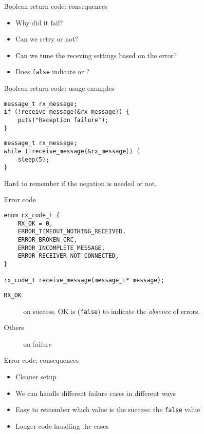 \documentclass[aspectratio=169,14pt]{beamer}
\begin{document}
\begin{frame}[fragile]{Boolean return code: consequences}
    \begin{itemize}
        \item Why did it fail?
        \item Can we retry or not?
        \item Can we tune the receving settings based on the error?
        \item Does \texttt{false} indicate  or ?
    \end{itemize}
\end{frame}


\begin{frame}[fragile]{Boolean return code: usage examples}
\begin{lstlisting}[style=cstyle]
message_t rx_message;
if (!receive_message(&rx_message)) {
    puts("Reception failure");
}
\end{lstlisting}

\begin{lstlisting}[style=cstyle]
message_t rx_message;
while (!receive_message(&rx_message)) {
    sleep(5);
}
\end{lstlisting}

Hard to remember if the negation is needed or not.
\end{frame}


\begin{frame}[fragile]{Error code}
\begin{lstlisting}[style=cstyle]
enum rx_code_t {
    RX_OK = 0,
    ERROR_TIMEOUT_NOTHING_RECEIVED,
    ERROR_BROKEN_CRC,
    ERROR_INCOMPLETE_MESSAGE,
    ERROR_RECEIVER_NOT_CONNECTED,
}

rx_code_t receive_message(message_t* message);
\end{lstlisting}

\begin{description}
    \item[\texttt{RX\_OK}] on success. OK is (\texttt{false}) to indicate the \textit{absence} of errors.
    \item[Others] on failure
\end{description}
\end{frame}


\begin{frame}[fragile]{Error code: consequences}
    \begin{itemize}
        \item Cleaner setup
        \item We can handle different failure cases in different ways
        \item Easy to remember which value is the success: the \texttt{false} value
        \item Longer code handling the cases
    \end{itemize}
\end{frame}
\end{document}
